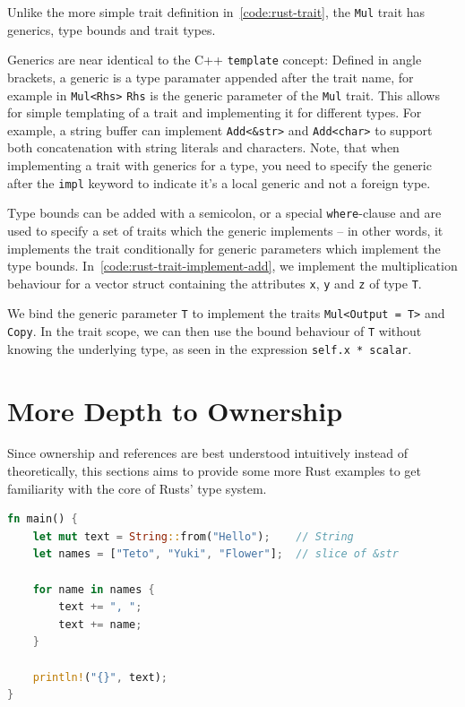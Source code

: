 \documentclass[11pt,
               a4paper,
               bibtotoc,
               idxtotoc,
               headsepline,
               footsepline,
               footexclude,
               BCOR12mm,
               DIV13,
               openany,   %
               ]
               {scrbook}
\begin{document}
Unlike the more simple trait definition in~\autoref{code:rust-trait}, the \texttt{Mul} trait has generics, type bounds and trait types.

Generics are near identical to the C++ \texttt{template} concept: Defined in angle brackets, a generic is a type paramater appended after the trait name, for example in \texttt{Mul<Rhs>} \texttt{Rhs} is the generic parameter of the \texttt{Mul} trait. This allows for simple templating of a trait and implementing it for different types. For example, a string buffer can implement \texttt{Add<\&str>} and \texttt{Add<char>} to support both concatenation with string literals and characters. Note, that when implementing a trait with generics for a type, you need to specify the generic after the \texttt{impl} keyword to indicate it's a local generic and not a foreign type.

Type bounds can be added with a semicolon, or a special \texttt{where}-clause and are used to specify a set of traits which the generic implements -- in other words, it implements the trait conditionally for generic parameters which implement the type bounds. In~\autoref{code:rust-trait-implement-add}, we implement the multiplication behaviour for a vector struct containing the attributes \texttt{x}, \texttt{y} and \texttt{z} of type \texttt{T}.

We bind the generic parameter \texttt{T} to implement the traits \texttt{Mul<Output = T>} and \texttt{Copy}. In the trait scope, we can then use the bound behaviour of \texttt{T} without knowing the underlying type, as seen in the expression \texttt{self.x * scalar}.

\section{More Depth to Ownership}\label{section:rust-ownership-appendix}

Since ownership and references are best understood intuitively instead of theoretically, this sections aims to provide some more Rust examples to get familiarity with the core of Rusts' type system.

\vspace{0.5em}
\begin{lstlisting}[style=eclipse-rust, language=Rust, basicstyle=\ttfamily\small, label=code:rust-ownership-appendix-example1]
fn main() {
    let mut text = String::from("Hello");    // String
    let names = ["Teto", "Yuki", "Flower"];  // slice of &str

    for name in names {
        text += ", ";
        text += name;
    }

    println!("{}", text);
}
\end{lstlisting}
\end{document}
